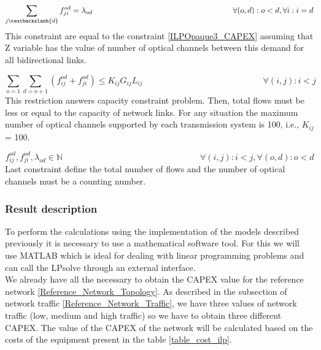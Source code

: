 \begin{equation}
\sum_{j\textbackslash \{d\}} f_{ji}^{od} = \lambda_{od}  \qquad \qquad \qquad \qquad \qquad \qquad \qquad \qquad \qquad
\forall(o,d) : o < d, \forall i: i = d
\label{ILPTransp3_surv}
\end{equation}
\noindent
This constraint are equal to the constraint \ref{ILPOpaque3_CAPEX} assuming that Z variable has the value of number of optical channels between this demand for all bidirectional links.

\begin{equation}
\sum_{o=1} \sum_{d=o+1} \left(f_{ij}^{od} + f_{ji}^{od}\right) \leq K_{ij} G_{ij} L_{ij} \qquad \qquad \qquad \qquad \qquad \qquad \qquad
\forall(i,j) : i < j
\label{ILPTransp4_surv}
\end{equation}
\noindent
This restriction answers capacity constraint problem. Then, total flows must be less or equal to the capacity of network links. For any situation the maximum number of optical channels supported by each transmission system is 100, i.e., $K_{ij}$ = 100.

\begin{equation}
f_{ij}^{od} , f_{ji}^{od} , \lambda_{od} \in \mathbb{N}   \qquad \qquad \qquad \qquad \qquad \qquad \qquad \qquad
\forall(i,j) : i < j, \forall(o,d) : o < d
\label{ILPTransp5_surv}
\end{equation}
\noindent
Last constraint define the total number of flows and the number of optical channels must be a counting number.\\


\subsubsection{Result description}

To perform the calculations using the implementation of the models described previously it is necessary to use a mathematical software tool. For this we will use MATLAB which is ideal for dealing with linear programming problems and can call the LPsolve through an external interface.\\
We already have all the necessary to obtain the CAPEX value for the reference network \ref{Reference_Network_Topology}. As described in the subsection of network traffic \ref{Reference_Network_Traffic}, we have three values of network traffic (low, medium and high traffic) so we have to obtain three different CAPEX.
The value of the CAPEX of the network will be calculated based on the costs of the equipment present in the table \ref{table_cost_ilp}.

